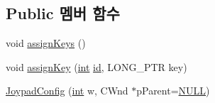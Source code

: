 \subsection*{Public 멤버 함수}
\begin{DoxyCompactItemize}
\item 
void \mbox{\hyperlink{class_joypad_config_a37ced249f71ab247733787e07085e295}{assign\+Keys}} ()
\item 
void \mbox{\hyperlink{class_joypad_config_a6fe836465dc6d861d96691c03ad0a636}{assign\+Key}} (\mbox{\hyperlink{_util_8cpp_a0ef32aa8672df19503a49fab2d0c8071}{int}} \mbox{\hyperlink{_commands_8cpp_a7b7a6396b2c82ad46c6d8b2bf141a8dd}{id}}, L\+O\+N\+G\+\_\+\+P\+TR key)
\item 
\mbox{\hyperlink{class_joypad_config_ade281c386d18c3e9ab2d806cd89ab7ce}{Joypad\+Config}} (\mbox{\hyperlink{_util_8cpp_a0ef32aa8672df19503a49fab2d0c8071}{int}} w, C\+Wnd $\ast$p\+Parent=\mbox{\hyperlink{_system_8h_a070d2ce7b6bb7e5c05602aa8c308d0c4}{N\+U\+LL}})
\end{DoxyCompactItemize}
